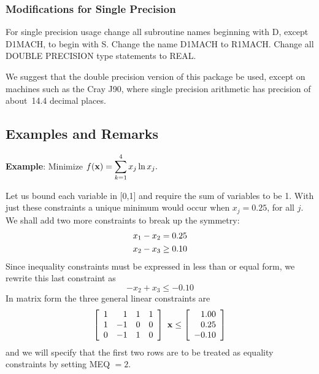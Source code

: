\documentclass[twoside]{MATH77}
\begin{document}
\subsubsection{Modifications for Single Precision}

For single precision usage change all subroutine names beginning with D,
except D1MACH, to begin with S. Change the name D1MACH to R1MACH. Change all
DOUBLE PRECISION type statements to REAL.

We suggest that the double precision version of this package be used,
except on machines such as the Cray J90, where single precision arithmetic
has precision of about~14.4 decimal places.

\subsection{Examples and Remarks}

{\bf Example}: Minimize ${\displaystyle f({\bf x})=\sum_{k=1}^4x_j\ln x_j.}$

Let us bound each variable in [0,1] and require the sum of variables to be
1. With just these constraints a unique minimum would occur when $x_j=0.25$,
for all $j$. We shall add two more constraints to break up the symmetry:%
\vspace{-4pt}%
\begin{align*}
x_1-x_2&=0.25\vspace{-4pt}\\
x_2-x_3&\geq 0.10
\end{align*}
Since inequality constraints must be expressed in less than or equal form,
we rewrite this last constraint as%
\begin{equation*}
-x_2+x_3\leq -0.10
\end{equation*}
In matrix form the three general linear constraints are%
\begin{equation*}
\left[
\begin{array}{rrrr}
1 & 1 & 1 & 1 \\
1 & -1 & 0 & 0 \\
0 & -1 & 1 & 0
\end{array}
\right] \ {\bf x}\leq \left[
\begin{array}{r}
1.00 \\
0.25 \\
-0.10
\end{array}
\right]
\end{equation*}
and we will specify that the first two rows are to be treated as equality
constraints by setting MEQ $=2.$
\end{document}
